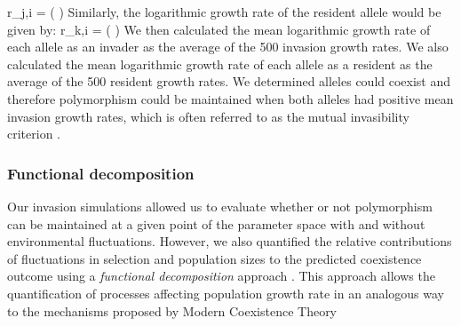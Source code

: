 \documentclass[12pt]{article}
\let\oldequation\equation
\let\oldendequation\endequation
\renewenvironment{equation}
  {\linenomathNonumbers\oldequation}
  {\oldendequation\endlinenomath}
\begin{document}
\begin{equation}
r_{j,i} =	\ln \left (  \right )
\label{invader}
\end{equation}
Similarly, the logarithmic growth rate of the resident allele would be given by:
\begin{equation}
r_{k,i} =	\ln \left (  \right )
\label{resident}
\end{equation}
We then calculated the mean logarithmic growth rate of each allele as an invader as the average of the 500 invasion growth rates. We also calculated the mean logarithmic growth rate of each allele as a resident as the average of the 500 resident growth rates. We determined alleles could coexist  and therefore polymorphism could be maintained when both alleles had positive mean invasion growth rates, which is often referred to as the mutual invasibility criterion \citep{barabas_chessons_2018}.


\subsubsection*{Functional decomposition}


Our invasion simulations allowed us to evaluate whether or not polymorphism can be maintained at a given point of the parameter space with and without environmental fluctuations. However, we also quantified the relative contributions of fluctuations in selection and population sizes to the predicted coexistence outcome using a \textit{functional decomposition} approach \citep{ellner2016quantify,ellner_expanded_2019, shoemaker2020}. This approach allows the quantification of processes affecting population growth rate in an analogous way to the mechanisms proposed by Modern Coexistence Theory \citep{ ellner2016quantify, ellner_expanded_2019}

\end{document}
